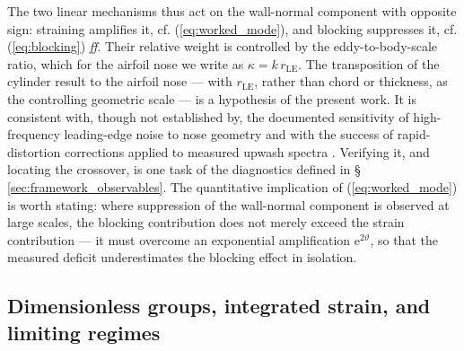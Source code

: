 \documentclass[lineno]{JFM-FLM_Au}
\begin{document}
The two linear mechanisms thus act on the wall-normal component with
opposite sign: straining amplifies it, cf. (\ref{eq:worked_mode}), and
blocking suppresses it, cf. (\ref{eq:blocking}) \emph{ff}. Their relative
weight is controlled by the eddy-to-body-scale ratio, which for the airfoil
nose we write as $\kappa = k\,r_{\mathrm{LE}}$. The transposition of the
cylinder result to the airfoil nose --- with $r_{\mathrm{LE}}$, rather than
chord or thickness, as the controlling geometric scale --- is a hypothesis
of the present work. It is consistent with, though not established by, the
documented sensitivity of high-frequency leading-edge noise to nose
geometry \citep{Gill2013,DevenportStaubsGlegg2010} and with the success of
rapid-distortion corrections applied to measured upwash spectra
\citep{deSantana2016,dosSantos2023}. Verifying it, and locating the
crossover, is one task of the diagnostics defined in
\S\,\ref{sec:framework_observables}. The quantitative implication of
(\ref{eq:worked_mode}) is worth stating: where suppression of the
wall-normal component is observed at large scales, the blocking
contribution does not merely exceed the strain contribution --- it must
overcome an exponential amplification $\mathrm{e}^{2\vartheta}$, so that
the measured deficit underestimates the blocking effect in isolation.

\subsection{Dimensionless groups, integrated strain, and limiting regimes}
\label{sec:framework_groups}
\end{document}

